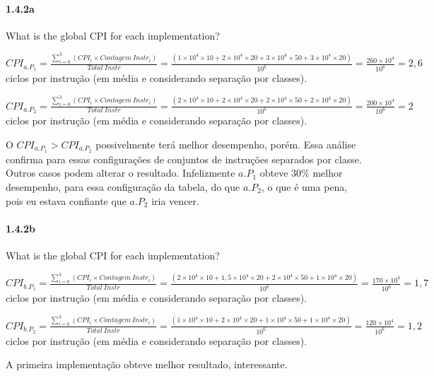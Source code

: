 \documentclass{article}
\begin{document}
\paragraph{1.4.2a} What is the global CPI for each implementation?

$CPI_{a.P_{1}} = \frac{\sum_{i=0}^{3} (CPI_{i} \times Contagem\
Instr_{i})}{Total\ Instr} = \frac{(1 \times 10^{4} \times 10 + 2 \times 10^{4}
\times 20 + 3 \times 10^{4} \times 50 + 3 \times 10^{4} \times 20)}{10^{6}} =
\frac{260 \times 10^{4}}{10^{6}} = 2,6$ ciclos por instrução (em média e
considerando separação por classes).

$CPI_{a.P_{2}} = \frac{\sum_{i=0}^{3} (CPI_{i} \times Contagem\
Instr_{i})}{Total\ Instr} = \frac{(2 \times 10^{4} \times 10 + 2 \times 10^{4}
\times 20 + 2 \times 10^{4} \times 50 + 2 \times 10^{4} \times 20)}{10^{6}} =
\frac{200 \times 10^{4}}{10^{6}} = 2$ ciclos por instrução (em média e
considerando separação por classes).

O $CPI_{a.P_{1}} > CPI_{a.P_{2}}$ possivelmente terá melhor desempenho, porém. 
Essa análise confirma para essas configurações de conjuntos de instruções 
separados por classe. Outros casos podem alterar o resultado. Infelizmente 
$a.P_{1}$ obteve $30\%$ melhor desempenho, para essa configuração da tabela, do 
que $a.P_{2}$, o que é uma pena, pois eu estava confiante que $a.P_{2}$ iria 
vencer.

\clearpage

\paragraph{1.4.2b} What is the global CPI for each implementation?

$CPI_{b.P_{1}} = \frac{\sum_{i=0}^{3} (CPI_{i} \times Contagem\
Instr_{i})}{Total\ Instr} = \frac{(2 \times 10^{4} \times 10 + 1,5 \times 10^{4}
\times 20 + 2 \times 10^{4} \times 50 + 1 \times 10^{4} \times 20)}{10^{6}} =
\frac{170 \times 10^{4}}{10^{6}} = 1,7$ ciclos por instrução (em média e
considerando separação por classes).

$CPI_{b.P_{2}} = \frac{\sum_{i=0}^{3} (CPI_{i} \times Contagem\
Instr_{i})}{Total\ Instr} = \frac{(1 \times 10^{4} \times 10 + 2 \times 10^{4}
\times 20 + 1 \times 10^{4} \times 50 + 1 \times 10^{4} \times 20)}{10^{6}} =
\frac{120 \times 10^{4}}{10^{6}} = 1,2$ ciclos por instrução (em média e
considerando separação por classes).

A primeira implementação obteve melhor resultado, interessante.
\end{document}
